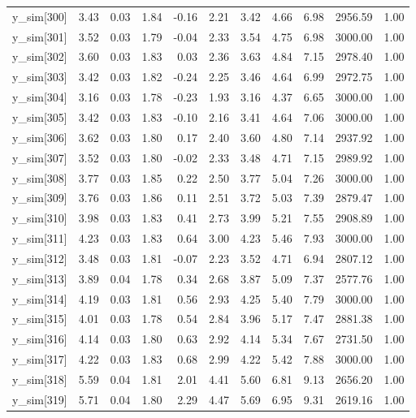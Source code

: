 \begin{table}[ht]
\begin{tabular}{rrrrrrrrrrr}
  y\_sim[300] & 3.43 & 0.03 & 1.84 & -0.16 & 2.21 & 3.42 & 4.66 & 6.98 & 2956.59 & 1.00 \\ 
  y\_sim[301] & 3.52 & 0.03 & 1.79 & -0.04 & 2.33 & 3.54 & 4.75 & 6.98 & 3000.00 & 1.00 \\ 
  y\_sim[302] & 3.60 & 0.03 & 1.83 & 0.03 & 2.36 & 3.63 & 4.84 & 7.15 & 2978.40 & 1.00 \\ 
  y\_sim[303] & 3.42 & 0.03 & 1.82 & -0.24 & 2.25 & 3.46 & 4.64 & 6.99 & 2972.75 & 1.00 \\ 
  y\_sim[304] & 3.16 & 0.03 & 1.78 & -0.23 & 1.93 & 3.16 & 4.37 & 6.65 & 3000.00 & 1.00 \\ 
  y\_sim[305] & 3.42 & 0.03 & 1.83 & -0.10 & 2.16 & 3.41 & 4.64 & 7.06 & 3000.00 & 1.00 \\ 
  y\_sim[306] & 3.62 & 0.03 & 1.80 & 0.17 & 2.40 & 3.60 & 4.80 & 7.14 & 2937.92 & 1.00 \\ 
  y\_sim[307] & 3.52 & 0.03 & 1.80 & -0.02 & 2.33 & 3.48 & 4.71 & 7.15 & 2989.92 & 1.00 \\ 
  y\_sim[308] & 3.77 & 0.03 & 1.85 & 0.22 & 2.50 & 3.77 & 5.04 & 7.26 & 3000.00 & 1.00 \\ 
  y\_sim[309] & 3.76 & 0.03 & 1.86 & 0.11 & 2.51 & 3.72 & 5.03 & 7.39 & 2879.47 & 1.00 \\ 
  y\_sim[310] & 3.98 & 0.03 & 1.83 & 0.41 & 2.73 & 3.99 & 5.21 & 7.55 & 2908.89 & 1.00 \\ 
  y\_sim[311] & 4.23 & 0.03 & 1.83 & 0.64 & 3.00 & 4.23 & 5.46 & 7.93 & 3000.00 & 1.00 \\ 
  y\_sim[312] & 3.48 & 0.03 & 1.81 & -0.07 & 2.23 & 3.52 & 4.71 & 6.94 & 2807.12 & 1.00 \\ 
  y\_sim[313] & 3.89 & 0.04 & 1.78 & 0.34 & 2.68 & 3.87 & 5.09 & 7.37 & 2577.76 & 1.00 \\ 
  y\_sim[314] & 4.19 & 0.03 & 1.81 & 0.56 & 2.93 & 4.25 & 5.40 & 7.79 & 3000.00 & 1.00 \\ 
  y\_sim[315] & 4.01 & 0.03 & 1.78 & 0.54 & 2.84 & 3.96 & 5.17 & 7.47 & 2881.38 & 1.00 \\ 
  y\_sim[316] & 4.14 & 0.03 & 1.80 & 0.63 & 2.92 & 4.14 & 5.34 & 7.67 & 2731.50 & 1.00 \\ 
  y\_sim[317] & 4.22 & 0.03 & 1.83 & 0.68 & 2.99 & 4.22 & 5.42 & 7.88 & 3000.00 & 1.00 \\ 
  y\_sim[318] & 5.59 & 0.04 & 1.81 & 2.01 & 4.41 & 5.60 & 6.81 & 9.13 & 2656.20 & 1.00 \\ 
  y\_sim[319] & 5.71 & 0.04 & 1.80 & 2.29 & 4.47 & 5.69 & 6.95 & 9.31 & 2619.16 & 1.00 \\ 

\end{tabular}
\end{table}
